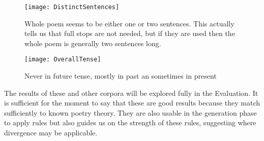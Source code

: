 \begin{figure}[t!]
\centering
\texttt{[image: DistinctSentences]}
\caption{Whole poem seems to be either one or two sentences. This actually tells us that full stops are not needed, but if they are used then the whole poem is generally two sentences long.}
\label{fig:distinct-sentences-chart}
\end{figure}

\begin{figure}[t!]
\centering
\texttt{[image: OverallTense]}
\caption{Never in future tense, mostly in past an sometimes in present}
\label{fig:overall-tense-chart}
\end{figure}

The results of these and other corpora will be explored fully in the Evaluation. It is sufficient for the moment to say that these are good results because they match sufficiently to known poetry theory. They are also usable in the generation phase to apply rules but also guides us on the strength of these rules, suggesting where divergence may be applicable.



